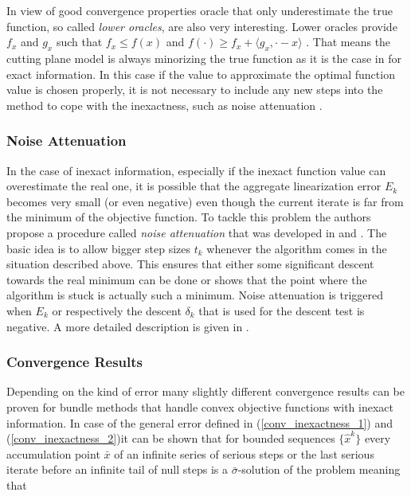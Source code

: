 In view of good convergence properties oracle that only underestimate the true function, so called \emph{lower oracles}, are also very interesting.
Lower oracles provide \(f_x\) and \(g_x\) such that \(f_x \leq f(x) \) and \(f(\cdot) \geq f_x + \langle g_x, \cdot - x\rangle\) . That means the cutting plane model is always minorizing the true function as it is the case in for exact information.
In this case if the value to approximate the optimal function value is chosen properly, it is not necessary to include any new steps into the method to cope with the inexactness, such as noise attenuation \cite[Corollary 5.2]{Oliveira2014}.

\subsubsection{Noise Attenuation}

In the case of inexact information, especially if the inexact function value can overestimate the real one, it is possible that the aggregate linearization error \(E_k\) becomes very small (or even negative) even though the current iterate is far from the minimum of the objective function.
To tackle this problem the authors propose a procedure called \emph{noise attenuation} that was developed in \cite{Hintermueller2001} and \cite{Kiwiel2006}.
The basic idea is to allow bigger step sizes \(t_k\) whenever the algorithm comes in the situation described above. This ensures that either some significant descent towards the real minimum can be done or shows that the point where the algorithm is stuck is actually such a minimum.
Noise attenuation is triggered when \(E_k\) or respectively the descent \(\delta_k\) that is used for the descent test is negative. A more detailed description is given in \cite{Oliveira2014}.

\subsubsection{Convergence Results}
Depending on the kind of error many slightly different convergence results can be proven for bundle methods that handle convex objective functions with inexact information.
In case of the general error defined in (\ref{conv_inexactness_1})  and (\ref{conv_inexactness_2})it can be shown that for bounded sequences \(\{\hat{x}^k\}\) every accumulation point \(\bar{x}\) of an infinite series of serious steps or the last serious iterate before an infinite tail of null steps is a \(\bar{\sigma}\)-solution of the problem meaning that 

